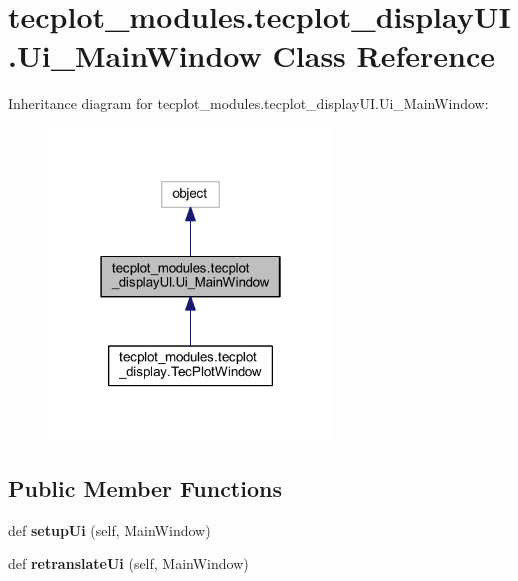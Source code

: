 \hypertarget{a00121}{}\section{tecplot\+\_\+modules.\+tecplot\+\_\+display\+U\+I.\+Ui\+\_\+\+Main\+Window Class Reference}
\label{a00121}


Inheritance diagram for tecplot\+\_\+modules.\+tecplot\+\_\+display\+U\+I.\+Ui\+\_\+\+Main\+Window\+:
\nopagebreak
\begin{figure}[H]
\begin{center}
\leavevmode
\includegraphics[width=214pt]{a00120}
\end{center}
\end{figure}
\subsection*{Public Member Functions}
\begin{DoxyCompactItemize}
\item 
\hypertarget{a00121_a84d83568b72995fc1f091c00044adb72}{}\label{a00121_a84d83568b72995fc1f091c00044adb72} 
def {\bfseries setup\+Ui} (self, Main\+Window)
\item 
\hypertarget{a00121_ae1811975426f7bbfcbe9bd6ae8a4d444}{}\label{a00121_ae1811975426f7bbfcbe9bd6ae8a4d444} 
def {\bfseries retranslate\+Ui} (self, Main\+Window)
\end{DoxyCompactItemize}
